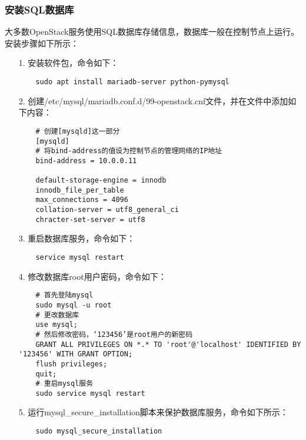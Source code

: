 \documentclass[a4paper,left=2.5cm,right=2.5cm,11pt]{article}
\begin{document}
\subsubsection{安装SQL数据库}
	大多数OpenStack服务使用SQL数据库存储信息，数据库一般在控制节点上运行。
	安装步骤如下所示：
	\begin{itemize}
		\item[1.] 安装软件包，命令如下：
		\begin{lstlisting}
	sudo apt install mariadb-server python-pymysql
		\end{lstlisting}

		\item[2.] 创建/etc/mysql/mariadb.conf.d/99-openstack.cnf文件，并在文件中添加如下内容：
		\begin{lstlisting}
	# 创建[mysqld]这一部分
	[mysqld]
	# 将bind-address的值设为控制节点的管理网络的IP地址
	bind-address = 10.0.0.11

	default-storage-engine = innodb
	innodb_file_per_table
	max_connections = 4096
	collation-server = utf8_general_ci
	chracter-set-server = utf8
		\end{lstlisting}

		\item[3.] 重启数据库服务，命令如下：
		\begin{lstlisting}
	service mysql restart
		\end{lstlisting}

		\item[4.] 修改数据库root用户密码，命令如下：
		\begin{lstlisting}
	# 首先登陆mysql
	sudo mysql -u root
	# 更改数据库
	use mysql;
	# 然后修改密码，‘123456’是root用户的新密码
	GRANT ALL PRIVILEGES ON *.* TO 'root'@'localhost' IDENTIFIED BY '123456' WITH GRANT OPTION;
	flush privileges;
	quit;
	# 重启mysql服务
	sudo service mysql restart
		\end{lstlisting}

		\item[5.] 运行mysql\_secure\_installation脚本来保护数据库服务，命令如下所示：
		\begin{lstlisting}
	sudo mysql_secure_installation
		\end{lstlisting}
	\end{itemize}
\end{document}
